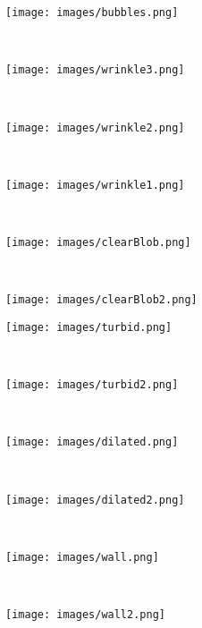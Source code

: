 \documentclass[review,12pt,3p]{elsarticle}
\begin{document}
\begin{figure}
        \centering
        \begin{subfigure}[b]{0.08\textwidth}
                \texttt{[image: images/bubbles.png]}
                \caption{}
                \label{fig:gull}
        \end{subfigure}%
        ~ %
        \begin{subfigure}[b]{0.08\textwidth}
                \texttt{[image: images/wrinkle3.png]}
                \caption{}
        \end{subfigure}
        ~
        \begin{subfigure}[b]{0.08\textwidth}
                \texttt{[image: images/wrinkle2.png]}
                \caption{}
        \end{subfigure}
        ~
        \begin{subfigure}[b]{0.08\textwidth}
                \texttt{[image: images/wrinkle1.png]}
                \caption{}
        \end{subfigure}
        ~
        \begin{subfigure}[b]{0.08\textwidth}
                \texttt{[image: images/clearBlob.png]}
                \caption{}
        \end{subfigure}
        ~
        \begin{subfigure}[b]{0.08\textwidth}
                \texttt{[image: images/clearBlob2.png]}
                \caption{}
        \end{subfigure}

        \begin{subfigure}[b]{0.08\textwidth}
                \texttt{[image: images/turbid.png]}
                \caption{}
        \end{subfigure}%
        ~
        \begin{subfigure}[b]{0.08\textwidth}
                \texttt{[image: images/turbid2.png]}
                \caption{}
        \end{subfigure}
        ~
        \begin{subfigure}[b]{0.08\textwidth}
                \texttt{[image: images/dilated.png]}
                \caption{}
        \end{subfigure}
        ~
        \begin{subfigure}[b]{0.08\textwidth}
                \texttt{[image: images/dilated2.png]}
                \caption{}
        \end{subfigure}
        ~
        \begin{subfigure}[b]{0.08\textwidth}
                \texttt{[image: images/wall.png]}
                \caption{}
        \end{subfigure}
        ~
        \begin{subfigure}[b]{0.08\textwidth}
                \texttt{[image: images/wall2.png]}
                \caption{}
        \end{subfigure}


\end{figure}
\end{document}
